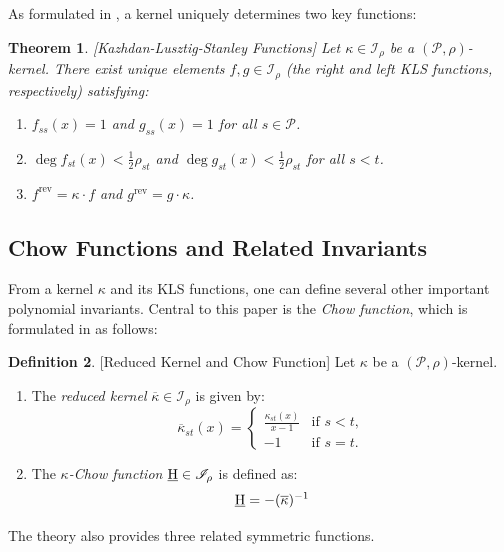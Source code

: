 \documentclass[11pt, letterpaper, english]{amsart}
\theoremstyle{teoremas}
\newtheorem{theorem}{Theorem}[section]
\theoremstyle{definition}
\newtheorem{definition}[theorem]{Definition}
\newcommand{\rev}{\operatorname{rev}}
\newcommand{\calP}{\mathcal{P}}
\newcommand{\chow}{\normalfont\text{\underline{H}}}
\begin{document}
As formulated in \cite{ferroni-matherne-vecchi}, a kernel uniquely determines two key functions:
\begin{theorem}\label{thm:kernel-properties} [Kazhdan-Lusztig-Stanley Functions]
    Let \(\kappa \in \mathscr{I}_\rho\) be a \((\calP,\rho)\)-kernel. There exist unique elements \(f, g \in \mathscr{I}_\rho\) (the right and left KLS functions, respectively) satisfying:
    \begin{enumerate}[\normalfont (i)]
        \item \(f_{ss}(x) = 1\) and \(g_{ss}(x) = 1\) for all \(s \in \calP\).
        \item \(\deg f_{st}(x) < \frac{1}{2} \rho_{st}\) and \(\deg g_{st}(x) < \frac{1}{2} \rho_{st}\) for all \(s < t\).
        \item \(f^{\rev} = \kappa \cdot f\) and \(g^{\rev} = g \cdot \kappa\).
    \end{enumerate}
\end{theorem}

\subsection{Chow Functions and Related Invariants}
From a kernel \(\kappa\) and its KLS functions, one can define several other
important polynomial invariants.
Central to this paper is the \emph{Chow function},
which is formulated in \cite{ferroni-matherne-vecchi} as follows:

\begin{definition}\label{def:chow-reduced} [Reduced Kernel and Chow Function]
    Let \(\kappa\) be a \((\calP,\rho)\)-kernel.
    \begin{enumerate}
        \item The \emph{reduced kernel} \(\overline{\kappa} \in \mathscr{I}_\rho\) is given by:
              \[ \overline{\kappa}_{st}(x) = \begin{cases} \frac{\kappa_{st}(x)}{x - 1} & \text{if } s < t, \\ -1 & \text{if } s = t.\end{cases}\]
        \item The \emph{\(\kappa\)-Chow function} \(\chow \in \mathscr{I}_\rho\) is defined as:
              \[ \chow = - (\overline{\kappa})^{-1}\]
    \end{enumerate}
\end{definition}

The theory also provides three related symmetric functions.
\end{document}
